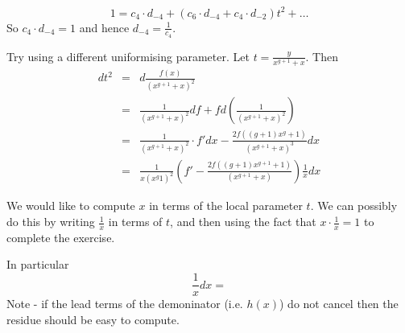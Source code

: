 \documentclass[draft, 11pt]{article} %
\theoremstyle{plain}
\theoremstyle{remark}
\begin{document}
\[
1 = c_4\cdot d_{-4} + (c_6\cdot d_{-4} + c_4\cdot d_{-2})t^2 + \ldots
\]
So $c_4 \cdot d_{-4} = 1$ and hence $d_{-4} = \frac{1}{c_4}$.


Try using a different uniformising parameter.
Let $t=\frac{y}{x^{g+1}+x}$.
Then 
\begin{eqnarray}
dt^2 & = & d\frac{f(x)}{(x^{g+1}+x)^2} \\
& = & 	\frac{1}{(x^{g+1}+x)^2}df + fd\left ( \frac{1}{(x^{g+1}+x)^2} \right ) \\
& = & 	\frac{1}{(x^{g+1}+x)^2}\cdot f'dx - \frac{2f((g+1)x^g + 1)}{(x^{g+1}+x)^3}dx \\
& = &  \frac{1}{x(x^g1)^2} \left ( f' - \frac{2f((g+1)x^{g+1}+1)}{(x^{g+1}+x)} \right) \frac{1}{x}dx 
\end{eqnarray}

We would like to compute $x$ in terms of the local parameter $t$.
We can possibly do this by writing $\frac{1}{x}$ in terms of $t$, and then using the fact that $x\cdot \frac{1}{x} = 1$ to complete the exercise.

In particular 
\[
\frac{1}{x}dx  = 
\]
Note - if the lead terms of the demoninator (i.e. $h(x)$) do not cancel then the residue should be easy to compute.

%

\end{document}

